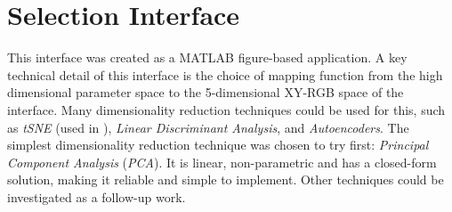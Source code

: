 \documentclass[11pt, oneside]{report}   	%
\begin{document}
\section{Selection Interface}\label{sec:SelectionDescription}
This interface was created as a MATLAB figure-based application. A key technical detail of this interface is the choice of mapping function from the high dimensional parameter space to the 5-dimensional XY-RGB space of the interface. Many dimensionality reduction techniques could be used for this, such as \emph{tSNE} (used in \cite{InfiniteDrum}), \emph{Linear Discriminant Analysis}, and \emph{Autoencoders}. The simplest dimensionality reduction technique was chosen to try first: \emph{Principal Component Analysis} (\emph{PCA}). It is linear, non-parametric and has a closed-form solution, making it reliable and simple to implement. Other techniques could be investigated as a follow-up work.
\end{document}
